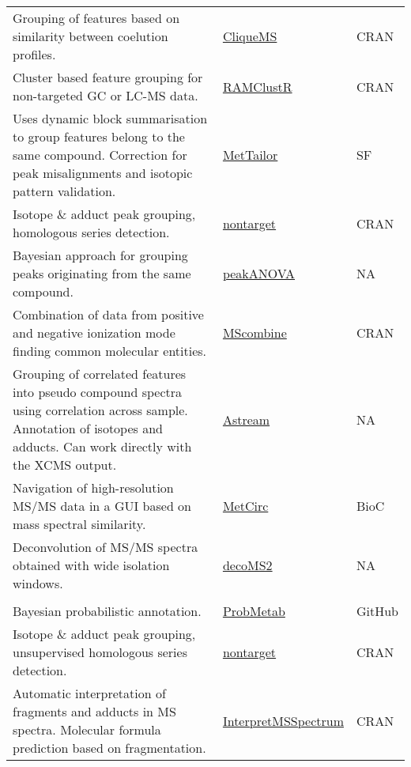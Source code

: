 \documentclass[]{article}
\begin{document}
\begin{longtable}{>{\raggedright\arraybackslash}p{30em}>{\raggedright\arraybackslash}p{10em}>{\raggedright\arraybackslash}p{3em}}
\rowcolor{gray!6}  Grouping of features based on similarity between coelution profiles. & \href{https://cran.r-project.org/web/packages/cliqueMS/}{CliqueMS} & CRAN\\
Cluster based feature grouping for non-targeted GC or LC-MS data. & \href{https://github.com/cbroeckl/RAMClustR}{RAMClustR} & CRAN\\
\rowcolor{gray!6}  Uses dynamic block summarisation to group features belong to the same compound. Correction for peak misalignments and isotopic pattern validation. & \href{https://sourceforge.net/projects/mettailor/}{MetTailor} & SF\\
Isotope {\&} adduct peak grouping, homologous series detection. & \href{https://cran.r-project.org/web/packages/nontarget/}{nontarget} & CRAN\\
\rowcolor{gray!6}  Bayesian approach for grouping peaks originating from the same compound. & \href{http://research.cs.aalto.fi/pml/software/peakANOVA/}{peakANOVA} & NA\\
Combination of data from positive and negative ionization mode finding common molecular entities. & \href{https://cran.r-project.org/package=MScombine}{MScombine} & CRAN\\
\rowcolor{gray!6}  Grouping of correlated features into pseudo compound spectra using correlation across sample. Annotation of isotopes and adducts. Can work directly with the XCMS output. & \href{http://www.urr.cat/AStream/AStream.html}{Astream} & NA\\
Navigation of high-resolution MS/MS data in a GUI based on mass spectral similarity. & \href{https://bioconductor.org/packages/release/bioc/html/MetCirc.html}{MetCirc} & BioC\\
\rowcolor{gray!6}  Deconvolution of MS/MS spectra obtained with wide isolation windows. & \href{http://pattilab.wustl.edu/software/decoms2/decoms2.php}{decoMS2} & NA\\
\addlinespace[0.3em]
\multicolumn{3}{l}{\textbf{Ion/adduct/fragment annotation}}\\
Bayesian probabilistic annotation. & \href{https://github.com/rsilvabioinfo/ProbMetab}{ProbMetab} & GitHub\\
\rowcolor{gray!6}  Isotope {\&} adduct peak grouping, unsupervised homologous series detection. & \href{https://cran.r-project.org/web/packages/nontarget/}{nontarget} & CRAN\\
Automatic interpretation of fragments and adducts in MS spectra. Molecular formula prediction based on fragmentation. & \href{https://cran.r-project.org/package=InterpretMSSpectrum}{InterpretMSSpectrum} & CRAN\\

\end{longtable}
\end{document}

